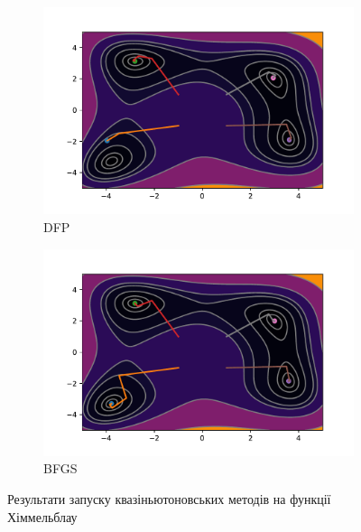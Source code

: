 \begin{figure}
    \ContinuedFloat
    \begin{subfigure}{0.5\textwidth}
        \includegraphics[width=\textwidth, trim=1cm 0.5cm 1.3cm 1cm, clip]{assets/DFP/himmelblau.pdf}
        \caption{DFP}
    \end{subfigure}
    \begin{subfigure}{0.5\textwidth}
        \includegraphics[width=\textwidth, trim=1cm 0.5cm 1.3cm 1cm, clip]{assets/BFGS/himmelblau.pdf}
        \caption{BFGS}
    \end{subfigure}
    \caption{Результати запуску квазіньютоновських методів на функції Хіммельблау}
\end{figure}

